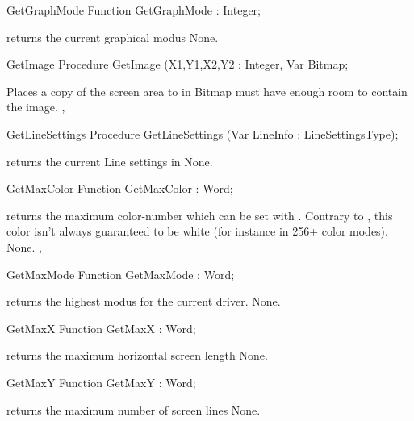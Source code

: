 \begin{function}{GetGraphMode}
\Declaration
Function GetGraphMode  : Integer;

\Description
{} returns the current graphical modus
\Errors
None.
\SeeAlso
{}
\end{function}

\begin{procedure}{GetImage}
\Declaration
Procedure GetImage (X1,Y1,X2,Y2 : Integer, Var Bitmap;

\Description
{}
Places a copy of the screen area  to  in 
\Errors
Bitmap must have enough room to contain the image.
\SeeAlso
{},
\end{procedure}

\begin{procedure}{GetLineSettings}
\Declaration
Procedure GetLineSettings (Var LineInfo : LineSettingsType);

\Description
{} returns the current Line settings in
\Errors
None.
\SeeAlso
{}
\end{procedure}

\begin{function}{GetMaxColor}
\Declaration
Function GetMaxColor  : Word;

\Description
{} returns the maximum color-number which can be 
set with . Contrary to \tp, this color isn't always 
guaranteed to be white (for instance in 256+ color modes).
\Errors
None.
\SeeAlso
{},
\end{function}

\begin{function}{GetMaxMode}
\Declaration
Function GetMaxMode  : Word;

\Description
{} returns the highest modus for
the current driver.
\Errors
None.
\SeeAlso
{}
\end{function}

\begin{function}{GetMaxX}
\Declaration
Function GetMaxX  : Word;

\Description
{} returns the maximum horizontal screen
length
\Errors
None.
\SeeAlso
{}
\end{function}

\begin{function}{GetMaxY}
\Declaration
Function GetMaxY  : Word;

\Description
{} returns the maximum number of screen
lines
\Errors
None.
\SeeAlso
{}
\end{function}

